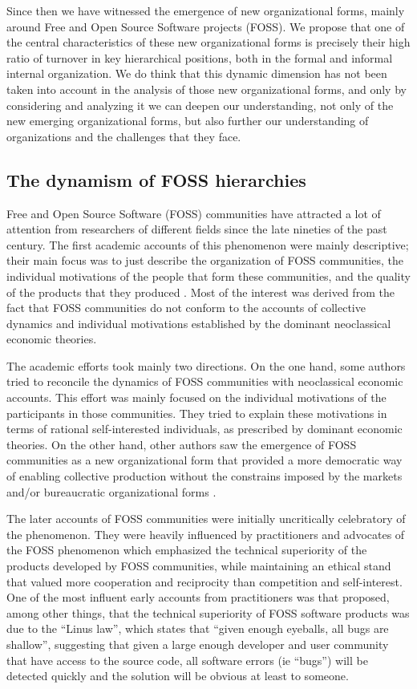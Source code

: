 Since then we have witnessed the emergence of new organizational forms, mainly around Free and Open Source Software projects (FOSS). We propose that one of the central characteristics of these new organizational forms is precisely their high ratio of turnover in key hierarchical positions, both in the formal and informal internal organization. We do think that this dynamic dimension has not been taken into account in the analysis of those new organizational forms, and only by considering and analyzing it we can deepen our understanding, not only of the new emerging organizational forms, but also further our understanding of organizations and the challenges that they face.

\subsection{The dynamism of FOSS hierarchies}

Free and Open Source Software (FOSS) communities have attracted a lot of attention from researchers of different fields since the late nineties of the past century. The first academic accounts of this phenomenon were mainly descriptive; their main focus was to just describe the organization of FOSS communities, the individual motivations of the people that form these communities, and the quality of the products that they produced \citep{benkler:2014}. Most of the interest was derived from the fact that FOSS communities do not conform to the accounts of collective dynamics and individual motivations established by the dominant neoclassical economic theories.

The academic efforts took mainly two directions. On the one hand, some authors tried to reconcile the dynamics of FOSS communities with neoclassical economic accounts. This effort was mainly focused on the individual motivations of the participants in those communities. They tried to explain these motivations in terms of rational self-interested individuals, as prescribed by dominant economic theories. On the other hand, other authors saw the emergence of FOSS communities as a new organizational form that provided a more democratic way of enabling collective production without the constrains imposed by the markets and/or bureaucratic organizational forms \citep{benkler:2002, benkler:2006, castells:2013}.

The later accounts of FOSS communities were initially uncritically celebratory of the phenomenon. They were heavily influenced by practitioners and advocates of the FOSS phenomenon which emphasized the technical superiority of the products developed by FOSS communities, while maintaining an ethical stand that valued more cooperation and reciprocity than competition and self-interest. One of the most influent early accounts from practitioners was \citet{raymond:1999} that proposed, among other things, that the technical superiority of FOSS software products was due to the ``Linus law'', which states that ``given enough eyeballs, all bugs are shallow'', suggesting that given a large enough developer and user community that have access to the source code, all software errors (ie ``bugs'') will be detected quickly and the solution will be obvious at least to someone.

